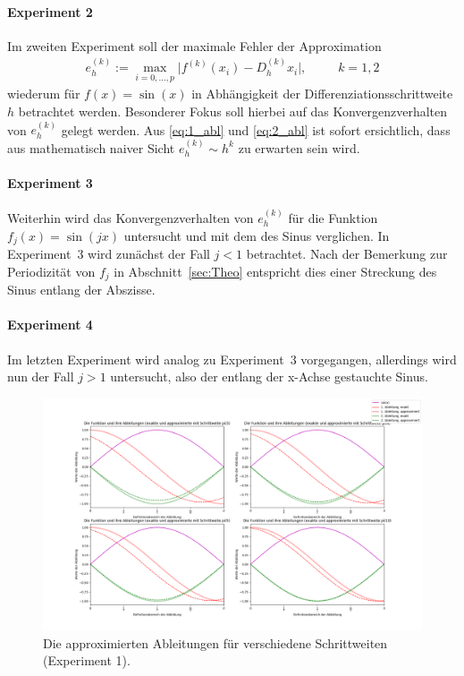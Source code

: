 \documentclass[smallheadings]{scrartcl}
\begin{document}
\paragraph{Experiment 2}
Im zweiten Experiment soll der maximale Fehler der Approximation 
\begin{align}
e_h^{(k)}:=\max\limits_{i=0,\dots,p}\vert f^{(k)}(x_i)-D_h^{(k)}x_i\vert\text{,~~~~~~~~}k=1,2
\end{align}
wiederum für $f(x)=\sin(x)$ in Abhängigkeit der Differenziationsschrittweite $h$ betrachtet werden. Besonderer Fokus soll hierbei auf das Konvergenzverhalten von $e_h^{(k)}$ gelegt werden. Aus \eqref{eq:1_abl} und \eqref{eq:2_abl} ist sofort ersichtlich, dass aus mathematisch naiver Sicht $e_h^{(k)}\sim h^k$ zu erwarten sein wird. 

\paragraph{Experiment 3}
Weiterhin wird das Konvergenzverhalten von $e_h^{(k)}$ für die Funktion $f_j(x)=\sin(jx)$ untersucht und mit dem des Sinus verglichen. In Experiment~3 wird zunächst der Fall $j<1$ betrachtet. Nach der Bemerkung zur Periodizität von $f_j$ in Abschnitt~\ref{sec:Theo} entspricht dies einer Streckung des Sinus entlang der Abszisse.

\paragraph{Experiment 4}
Im letzten Experiment wird analog zu Experiment~3 vorgegangen, allerdings wird nun der Fall $j>1$ untersucht, also der entlang der x-Achse gestauchte Sinus.


\begin{figure}
	\includegraphics[width=\linewidth]{4Bilder.png}
	\caption{Die approximierten Ableitungen für verschiedene Schrittweiten (Experiment 1).}
	\label{im:ablplot}
\end{figure}
\end{document}
